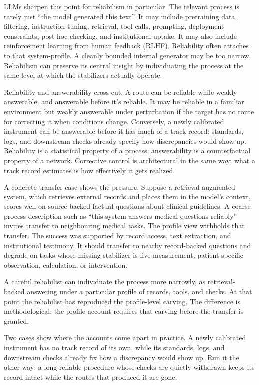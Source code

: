 \documentclass[12pt]{article}
\begin{document}
LLMs sharpen this point for reliabilism in particular. The relevant process is rarely
just \enquote{the model generated this text}. It may include pretraining data, filtering,
instruction tuning, retrieval, tool calls, prompting, deployment constraints, post-hoc
checking, and institutional uptake. It may also include reinforcement learning from human
feedback (RLHF). Reliability often attaches to that system-profile. A cleanly bounded
internal generator may be too narrow. Reliabilism can preserve its central insight by
individuating the process at the same level at which the stabilizers actually operate.

Reliability and answerability cross-cut. A route can be reliable while weakly answerable,
and answerable before it's reliable. It may be reliable in a familiar environment but
weakly answerable under perturbation if the target has no route for correcting it when
conditions change. Conversely, a newly calibrated instrument can be answerable before it
has much of a track record: standards, logs, and downstream checks already specify how
discrepancies would show up. Reliability is a statistical property of a process;
answerability is a counterfactual property of a network. Corrective control is architectural in the same
way; what a track record estimates is how effectively it gets realized.

A concrete transfer case shows the pressure. Suppose a retrieval-augmented system, which
retrieves external records and places them in the model's context, scores well on
source-backed factual questions about clinical guidelines. A coarse process description
such as \enquote{this system answers medical questions reliably} invites transfer to
neighbouring medical tasks. The profile view withholds that transfer. The success was
supported by record access, text extraction, and institutional testimony. It should
transfer to nearby record-backed questions and degrade on tasks whose missing stabilizer
is live measurement, patient-specific observation, calculation, or intervention.

A careful reliabilist can individuate the process more narrowly, as retrieval-backed
answering under a particular profile of records, tools, and checks. At that point the
reliabilist has reproduced the profile-level carving. The difference is methodological:
the profile account requires that carving before the transfer is granted.

Two cases show where the accounts come apart in practice. A newly
calibrated instrument has no track record of its own, while its standards, logs, and
downstream checks already fix how a discrepancy would show up. Run it the other way: a
long-reliable procedure whose checks are quietly withdrawn keeps its record intact while
the routes that produced it are gone.
\end{document}
